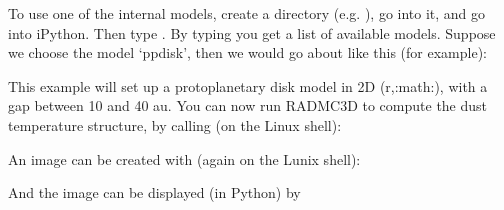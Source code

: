 \documentclass[letterpaper,10pt,english]{sphinxmanual}
\begin{document}
To use one of the \sphinxhyphen{}internal models, create a directory
(e.g. ), go into it, and go into iPython. Then type
. By typing  you get a list
of available models. Suppose we choose the model ‘ppdisk’, then we would go
about like this (for example):

\begin{sphinxVerbatim}[commandchars=\\\{\}]
   
     
\end{sphinxVerbatim}

This example will set up a protoplanetary disk model in 2\sphinxhyphen{}D (r,:math:),
with a gap between 10 and 40 au. You can now run RADMC\sphinxhyphen{}3D to compute the dust
temperature structure, by calling (on the Linux shell):

\begin{sphinxVerbatim}[commandchars=\\\{\}]
 
\end{sphinxVerbatim}

An image can be created with (again on the Lunix shell):

\begin{sphinxVerbatim}[commandchars=\\\{\}]
     
\end{sphinxVerbatim}

And the image can be displayed (in Python) by
\end{document}
